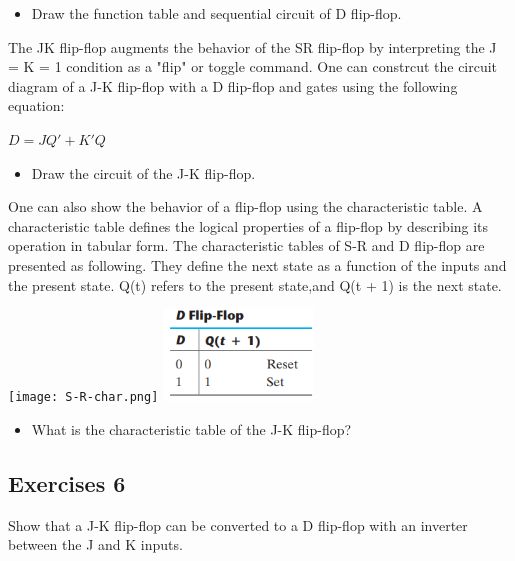 \documentclass[11pt]{article}
\begin{document}
\begin{itemize}
    \item Draw the function table and sequential circuit of D flip-flop.
\end{itemize}


\bigskip


The JK flip-flop augments the behavior of the SR flip-flop by interpreting the J = K = 1 condition as a "flip" or toggle command. One can constrcut the circuit diagram of a J-K flip-flop with a D flip-flop and gates using the following equation:
\begin{center}
    $D=JQ'+K'Q$
\end{center}

\begin{itemize}
    \item  Draw the circuit of the J-K flip-flop.
\end{itemize}

\bigskip


One can also show the behavior of a flip-flop using the characteristic table. A characteristic table defines the logical properties of a flip-flop by describing its operation in tabular form. The characteristic tables of S-R and D flip-flop are presented as following. They define the next state as a function of the inputs and the present state. Q(t) refers to the present state,and Q(t + 1) is the next state.

\begin{center}
\texttt{[image: S-R-char.png]}\quad
\includegraphics[width=40mm,scale=0.5]{D-cahr-table.png}
\end{center}


\begin{itemize}
    \item What is the characteristic table of the J-K flip-flop?
\end{itemize}



\subsection*{Exercises 6}

Show that a J-K flip-flop can be converted to a D flip-flop with an inverter between the J and K inputs.
\end{document}
